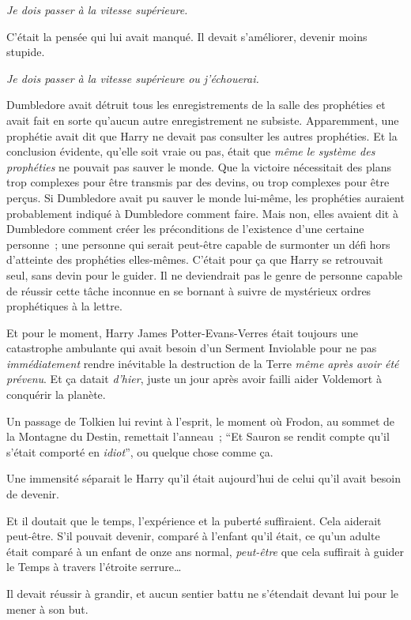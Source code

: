\emph{Je dois passer à la vitesse supérieure.}

C'était la pensée qui lui avait manqué.
Il devait s'améliorer, devenir moins stupide.

\emph{Je dois passer à la vitesse supérieure ou j'échouerai.}

Dumbledore avait détruit tous les enregistrements de la salle des prophéties et avait fait en sorte qu'aucun autre enregistrement ne subsiste.
Apparemment, une prophétie avait dit que Harry ne devait pas consulter les autres prophéties.
Et la conclusion évidente, qu'elle soit vraie ou pas, était que \emph{même le système des prophéties} ne pouvait pas sauver le monde.
Que la victoire nécessitait des plans trop complexes pour être transmis par des devins, ou trop complexes pour être perçus.
Si Dumbledore avait pu sauver le monde lui-même, les prophéties auraient probablement indiqué à Dumbledore comment faire.
Mais non, elles avaient dit à Dumbledore comment créer les préconditions de l'existence d'une certaine personne~; une personne qui serait peut-être capable de surmonter un défi hors d'atteinte des prophéties elles-mêmes.
C'était pour ça que Harry se retrouvait seul, sans devin pour le guider.
Il ne deviendrait pas le genre de personne capable de réussir cette tâche inconnue en se bornant à suivre de mystérieux ordres prophétiques à la lettre.

Et pour le moment, Harry James Potter-Evans-Verres était toujours une catastrophe ambulante qui avait besoin d'un Serment Inviolable pour ne pas \emph{immédiatement} rendre inévitable la destruction de la Terre \emph{même après avoir été prévenu}.
Et ça datait \emph{d'hier}, juste un jour après avoir failli aider Voldemort à conquérir la planète.

Un passage de Tolkien lui revint à l'esprit, le moment où Frodon, au sommet de la Montagne du Destin, remettait l'anneau~; “Et Sauron se rendit compte qu'il s'était comporté en \emph{idiot}”, ou quelque chose comme ça.

Une immensité séparait le Harry qu'il était aujourd'hui de celui qu'il avait besoin de devenir.

Et il doutait que le temps, l'expérience et la puberté suffiraient.
Cela aiderait peut-être.
S'il pouvait devenir, comparé à l'enfant qu'il était, ce qu'un adulte était comparé à un enfant de onze ans normal, \emph{peut-être} que cela suffirait à guider le Temps à travers l'étroite serrure…

Il devait réussir à grandir, et aucun sentier battu ne s'étendait devant lui pour le mener à son but.

